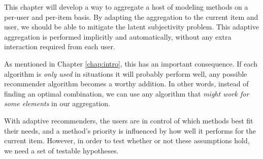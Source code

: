 This chapter will develop a way to aggregate a host of modeling methods on a per-user and per-item basis.
By adapting the aggregation to the current item and user, we should be able to mitigate the latent subjectivity problem. 
This adaptive aggregation is performed implicitly and automatically,
without any extra interaction required from each user.

As mentioned in Chapter \ref{chap:intro}, this has an important consequence.
If each algorithm is \emph{only used} in situations it will probably perform well,
any possible recommender algorithm becomes a worthy addition.
In other words, instead of finding an optimal combination,
we can use any algorithm that \emph{might work for some elements}
in our aggregation.

With adaptive recommenders, the users are in control of which methods best fit their needs, and
a method's priority is influenced by how well it performs for the current item.
However, in order to test whether or not these assumptions hold,
we need a set of testable hypotheses.

\clearpage
